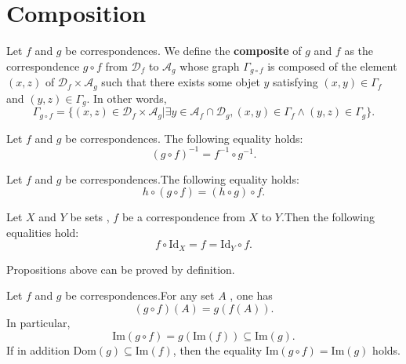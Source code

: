 \section{Composition}
\begin{definitionenv}
    Let $f$ and $g$ be correspondences. We define the \textbf{composite } of $g$ and $f$ as the correspondence $g\circ f$ from $\mathscr{D}_f$  to $\mathscr{A}_g$ whose graph $\Gamma_{g\circ f }$ is composed of the element $(x, z)$ of $\mathscr{D}_f\times \mathscr{A}_g$ such that there exists some objet $y$ satisfying $(x, y)\in \Gamma_f $ and $(y, z)\in \Gamma_g$. In other words, 
    $$\Gamma_{g\circ f }=\{(x, z)\in \mathscr{D}_f\times \mathscr{A}_g|\exists y\in \mathscr{A}_f\cap\mathscr{D}_g, (x, y)\in \Gamma_f \wedge (y, z)\in \Gamma_g\}.$$
\end{definitionenv}
\begin{propositionenv}
    Let $f$ and $g$ be correspondences. The following equality holds:
    \begin{equation}
        (g\circ f)^{-1}=f^{-1}\circ g^{-1}.
    \end{equation}
\end{propositionenv}
\begin{propositionenv}\label{proposition3.4.2}
    Let $f$ and $g$ be correspondences.The following equality holds:
    \begin{equation}
        h\circ (g\circ f)=(h\circ g)\circ f.
    \end{equation}
\end{propositionenv}
\begin{propositionenv}\label{proposition3.4.3}
    Let $X$ and $Y$ be sets , $f$ be a correspondence from $X$ to $Y$.Then the following equalities hold:
    $$f\circ \mathrm{Id}_X=f=\mathrm{Id}_Y\circ f.$$
\end{propositionenv}
Propositions above can be proved by definition.
\begin{propositionenv}\label{proposition3.4.4}
    Let $f$ and $g$ be correspondences.For any set $A$ , one has 
    $$(g\circ f)(A)=g(f(A)).$$
    In particular, 
    $$\mathrm{Im}(g\circ f)=g(\mathrm{Im}(f))\subseteq \mathrm{Im}(g).$$
    If in addition $\mathrm{Dom}(g)\subseteq \mathrm{Im}(f)$,  then the equality $\mathrm{Im}(g\circ f)=\mathrm{Im}(g)$ holds.
\end{propositionenv}
